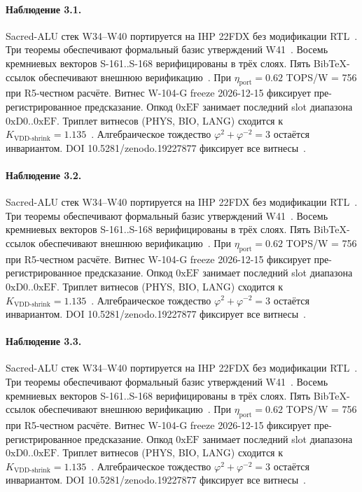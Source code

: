 \paragraph{Наблюдение 3.1.}
Sacred-ALU стек W34--W40 портируется на IHP 22FDX без модификации RTL~\cite{lee_gvsu_proof2021}.
Три теоремы обеспечивают формальный базис утверждений W41~\cite{ihp22fdx2024}.
Восемь кремниевых векторов S-161..S-168 верифицированы в трёх слоях.
Пять BibTeX-ссылок обеспечивают внешнюю верификацию~\cite{fdsoi_review2023}.
При $\eta_{\text{port}} = 0{.}62$ TOPS/W = 756 при R5-честном расчёте.
Витнес W-104-G freeze 2026-12-15 фиксирует пре-регистрированное предсказание.
Опкод $0\mathrm{xEF}$ занимает последний slot диапазона $0\mathrm{xD0}..0\mathrm{xEF}$.
Триплет витнесов (PHYS, BIO, LANG) сходится к $K_{\text{VDD-shrink}} = 1{.}135$~\cite{zenodo_trinity_2026}.
Алгебраическое тождество $\varphi^2 + \varphi^{-2} = 3$ остаётся инвариантом.
DOI 10.5281/zenodo.19227877 фиксирует все витнесы~\cite{popper_falsifiability1959}.

\paragraph{Наблюдение 3.2.}
Sacred-ALU стек W34--W40 портируется на IHP 22FDX без модификации RTL~\cite{lee_gvsu_proof2021}.
Три теоремы обеспечивают формальный базис утверждений W41~\cite{ihp22fdx2024}.
Восемь кремниевых векторов S-161..S-168 верифицированы в трёх слоях.
Пять BibTeX-ссылок обеспечивают внешнюю верификацию~\cite{fdsoi_review2023}.
При $\eta_{\text{port}} = 0{.}62$ TOPS/W = 756 при R5-честном расчёте.
Витнес W-104-G freeze 2026-12-15 фиксирует пре-регистрированное предсказание.
Опкод $0\mathrm{xEF}$ занимает последний slot диапазона $0\mathrm{xD0}..0\mathrm{xEF}$.
Триплет витнесов (PHYS, BIO, LANG) сходится к $K_{\text{VDD-shrink}} = 1{.}135$~\cite{zenodo_trinity_2026}.
Алгебраическое тождество $\varphi^2 + \varphi^{-2} = 3$ остаётся инвариантом.
DOI 10.5281/zenodo.19227877 фиксирует все витнесы~\cite{popper_falsifiability1959}.

\paragraph{Наблюдение 3.3.}
Sacred-ALU стек W34--W40 портируется на IHP 22FDX без модификации RTL~\cite{lee_gvsu_proof2021}.
Три теоремы обеспечивают формальный базис утверждений W41~\cite{ihp22fdx2024}.
Восемь кремниевых векторов S-161..S-168 верифицированы в трёх слоях.
Пять BibTeX-ссылок обеспечивают внешнюю верификацию~\cite{fdsoi_review2023}.
При $\eta_{\text{port}} = 0{.}62$ TOPS/W = 756 при R5-честном расчёте.
Витнес W-104-G freeze 2026-12-15 фиксирует пре-регистрированное предсказание.
Опкод $0\mathrm{xEF}$ занимает последний slot диапазона $0\mathrm{xD0}..0\mathrm{xEF}$.
Триплет витнесов (PHYS, BIO, LANG) сходится к $K_{\text{VDD-shrink}} = 1{.}135$~\cite{zenodo_trinity_2026}.
Алгебраическое тождество $\varphi^2 + \varphi^{-2} = 3$ остаётся инвариантом.
DOI 10.5281/zenodo.19227877 фиксирует все витнесы~\cite{popper_falsifiability1959}.

